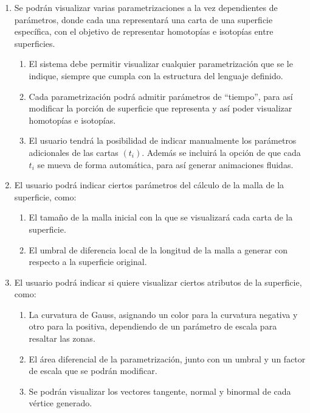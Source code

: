 	\begin{enumerate}
		\item Se podrán visualizar varias parametrizaciones a la vez dependientes de parámetros, donde cada una representará una carta de una superficie específica, con el objetivo de representar homotopías e isotopías entre superficies.
		
		\begin{enumerate}
			\item El sistema debe permitir visualizar cualquier parametrización que se le indique, siempre que cumpla con la estructura del lenguaje definido.
			\item Cada parametrización podrá admitir parámetros de ``tiempo'', para así modificar la porción de superficie que representa y así poder visualizar homotopías e isotopías.
			\item El usuario tendrá la posibilidad de indicar manualmente los parámetros adicionales de las cartas $(t_i)$. Además se incluirá la opción de que cada $t_i$ se mueva de forma automática, para así generar animaciones fluidas.
		\end{enumerate}
		
		\item El usuario podrá indicar ciertos parámetros del cálculo de la malla de la superficie, como:
		\begin{enumerate}
			\item El tamaño de la malla inicial con la que se visualizará cada carta de la superficie.
			\item El umbral de diferencia local de la longitud de la malla a generar con respecto a la superficie original.
		\end{enumerate}
			
		\item El usuario podrá indicar si quiere visualizar ciertos atributos de la superficie, como:
		\begin{enumerate}
			\item La curvatura de Gauss, asignando un color para la curvatura negativa y otro para la positiva, dependiendo de un parámetro de escala para resaltar las zonas.
			\item El área diferencial de la parametrización, junto con un umbral y un factor de escala que se podrán modificar.
			\item Se podrán visualizar los vectores tangente, normal y binormal de cada vértice generado.
		\end{enumerate}
		

\end{enumerate}
